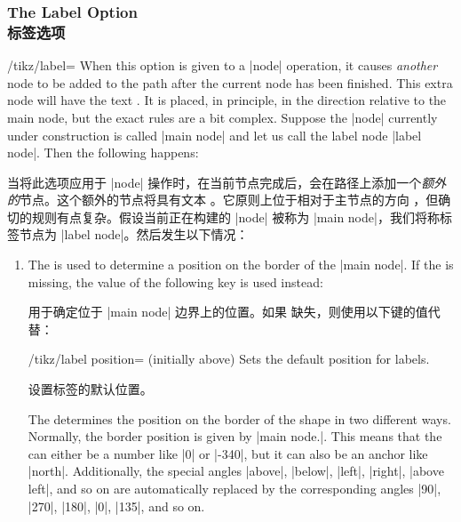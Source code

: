 \subsubsection{The Label Option\\标签选项}

\begin{key}{/tikz/label=}
        \label{label-option}%
    When this option is given to a |node| operation, it causes \emph{another}
    node to be added to the path after the current node has been finished. This
    extra node will have the text . It is placed, in principle, in
    the direction  relative to the main node, but the exact rules
    are a bit complex. Suppose the |node| currently under construction is
    called |main node| and let us call the label node |label node|. Then the
    following happens:
    
    当将此选项应用于 |node| 操作时，在当前节点完成后，会在路径上添加一个\emph{额外的}节点。这个额外的节点将具有文本 。它原则上位于相对于主节点的方向 ，但确切的规则有点复杂。假设当前正在构建的 |node| 被称为 |main node|，我们将称标签节点为 |label node|。然后发生以下情况：

    \begin{enumerate}
        \item The  is used to determine a position on the border of
            the |main node|. If the  is missing, the value of the
            following key is used instead:
            
             用于确定位于 |main node| 边界上的位置。如果  缺失，则使用以下键的值代替：

            \begin{key}{/tikz/label position= (initially above)}
                Sets the default position for labels.

                设置标签的默认位置。
            \end{key}
            The  determines the position on the border of the shape
            in two different ways. Normally, the border position is given by
            |main node.|. This means that the  can
            either be a number like |0| or |-340|, but it can also be an anchor
            like |north|. Additionally, the special angles |above|, |below|,
            |left|, |right|, |above left|, and so on are automatically replaced
            by the corresponding angles |90|, |270|, |180|, |0|, |135|, and so
            on.


\end{enumerate}
\end{key}
